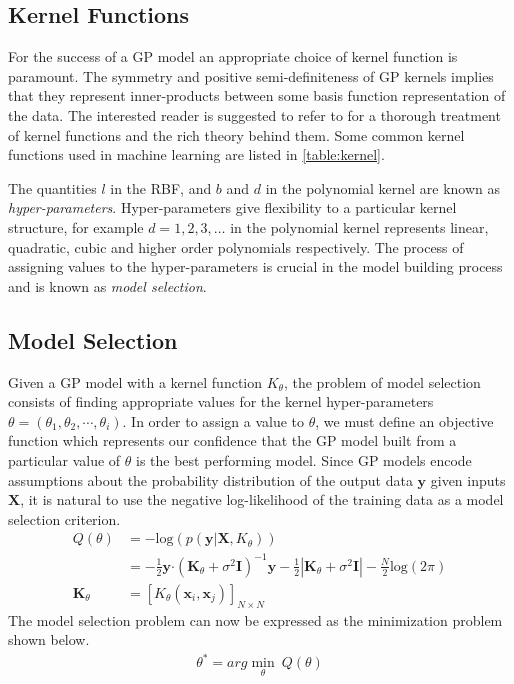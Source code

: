 \subsection{Kernel Functions}

For the success of a GP model an appropriate choice of kernel function is paramount. The symmetry 
and positive semi-definiteness of GP kernels implies that they represent inner-products between 
some basis function representation of the data. The interested reader is suggested to refer to 
\citet{Berlinet2004,Scholkopf:2001:LKS:559923,hofmann2008} for a thorough treatment of kernel 
functions and the rich theory behind them. Some common kernel functions used in machine learning 
are listed in \cref{table:kernel}. 

The quantities $l$ in the RBF, and $b$ and $d$ in the polynomial kernel are known as 
\emph{hyper-parameters}. Hyper-parameters give flexibility to a particular kernel structure, for 
example $d = 1, 2, 3, \dots$ in the polynomial kernel represents linear, quadratic, cubic and 
higher order polynomials respectively. The process of assigning values to the 
hyper-parameters is crucial in the model building process and is known as \emph{model selection}. 

\subsection{Model Selection}\label{sec:gpModelSelection}

Given a GP model with a kernel function $K_\theta$, the problem of model selection consists of 
finding appropriate values for the kernel hyper-parameters 
$\theta = \left(\theta_1, \theta_2, \cdots, \theta_i\right)$. In order to assign a value to 
$\theta$, we must define an objective function which represents our confidence that the GP model 
built from a particular value of $\theta$ is the best performing model. Since GP models encode 
assumptions about the probability distribution of the output data $\mathbf{y}$ given inputs 
$\mathbf{X}$, it is natural to use the negative log-likelihood of the training data as a model 
selection criterion. 
%
\begin{align*}
  Q(\theta) & = - \text{log}(p(\mathbf{y}|\mathbf{X}, K_\theta)) \\
            & = -\frac{1}{2} \mathbf{y}\boldsymbol{\cdot} (\mathbf{K}_\theta + \sigma^{2} \mathbf{I})^{-1} \mathbf{y} - \frac{1}{2}|\mathbf{K}_\theta + \sigma^{2} \mathbf{I}| - \frac{N}{2}\text{log}(2\pi) \\
  \mathbf{K}_\theta & = [K_{\theta}(\mathbf{x}_i, \mathbf{x}_j)]_{N \times N}
\end{align*}
%
The model selection problem can now be expressed as the minimization problem shown below.
%
\begin{align*}
\theta^* = arg\min_{\theta} \ Q(\theta)
\end{align*}

